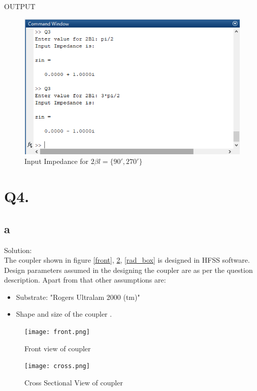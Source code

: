 OUTPUT
\begin{figure}[!ht]
	\centering
	\includegraphics[scale=0.9]{q3.png}
	\caption{\label{q1}  Input Impedance for $2 \beta l = \{90', 270'\}$}
\end{figure}

\newpage
\section{Q4.} %
\subsection{a}
Solution:\\

The coupler shown in figure \ref{front}, \ref{cross}, \ref{rad_box} is designed in HFSS software. Design parameters assumed in the designing the coupler are as per the question description. Apart from that other assumptions are:

\begin{itemize}
		\item Substrate: "Rogers Ultralam 2000 (tm)"
		\item Shape and size of the coupler \cite{4084811}.
\end{itemize}

\begin{figure}[!htb]
   \begin{minipage}{0.48\textwidth}
     \centering
     \texttt{[image: front.png]}
     \caption{Front view of coupler}\label{front}
   \end{minipage}
   \begin{minipage}{0.48\textwidth}
     \centering
     \texttt{[image: cross.png]}
     \caption{Cross Sectional View of coupler}\label{cross}
   \end{minipage}
\end{figure}

